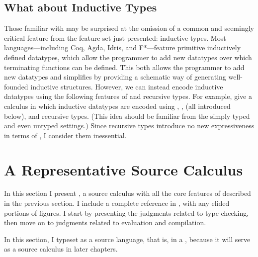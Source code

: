 {\subsection{What about Inductive Types}
Those familiar with  may be surprised at the omission of a
common and seemingly critical feature from the feature set just presented:
inductive types.
Most  languages---including Coq, Agda, Idris, and
F*---feature primitive inductively defined datatypes, which allow the programmer
to add new datatypes over which terminating functions can be defined.
This both allows the programmer to add new datatypes and simplifies
 by providing a schematic way of generating
well-founded inductive structures.
However, we can instead encode inductive datatypes using the following features
of  and recursive types.
For example, \citet{altenkirch2010} give a  calculus
in which inductive datatypes are encoded using ,
,  (all introduced below),
and recursive types.
(This idea should be familiar from the simply typed and even untyped settings.)
Since recursive types introduce no new expressiveness in terms of
, I consider them inessential.
}

\renewcommand{\scolor}[1]{\mathcolor{RoyalBlue}{#1}}
\renewcommand{\sfont}[1]{\scolor{\mathsf{#1}}}
\renewcommand{\sfontsym}[1]{\sfont{#1}}

\section{A Representative Source Calculus}
\label{sec:source}
\FigECCSyntax

In this section I present \slang, a source calculus with all the core features
of  described in the previous section.
I include a complete reference in , with any
elided portions of figures.
I start by presenting the judgments related to type checking, then move on to
judgments related to evaluation and compilation.

\begin{typographical}
In this section, I typeset \slang as a source language, that is, in a
\emph{}, because it will serve as a
source calculus in later chapters.
\end{typographical}

